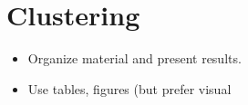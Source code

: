 \section{Clustering}\label{Sec:cluster}





\begin{itemize}

    \item Organize material and present results.

    \item Use tables, figures (but prefer visual 
\end{itemize}
